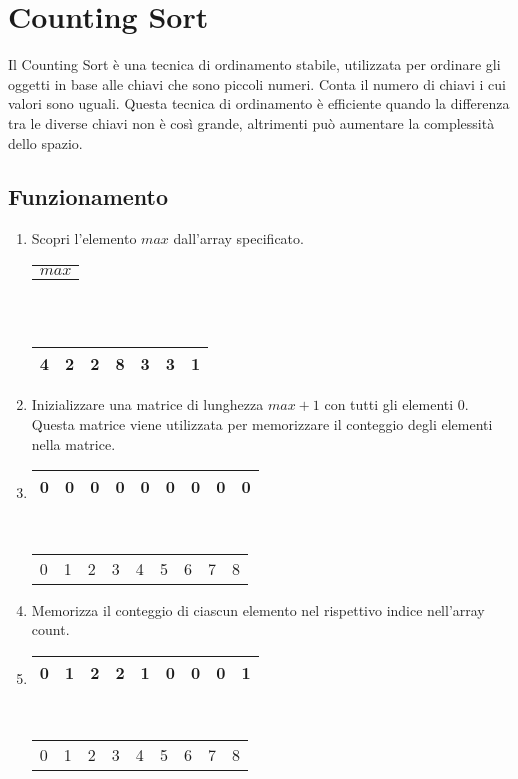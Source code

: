 \section{Counting Sort}
Il Counting Sort è una tecnica di ordinamento stabile, utilizzata per ordinare gli oggetti in base alle chiavi che sono piccoli numeri. Conta il numero di chiavi i cui valori sono uguali. Questa tecnica di ordinamento è efficiente quando la differenza tra le diverse chiavi non è così grande, altrimenti può aumentare la complessità dello spazio.

\subsection{Funzionamento}
\begin{enumerate}
    \item Scopri l'elemento $max$ dall'array specificato. \\
    \begin{tabular}{c}
        $max$ \\ 
    \end{tabular}
    \\
    \begin{tabular}{|c|}
        \hline
        \; 8 \; \\ 
        \hline
    \end{tabular}
    \begin{tabular}{|c|c|c|c|c|c|c|}
        \hline
        4 & 2 & 2 & 8 & 3 & 3 & 1 \\ 
        \hline
    \end{tabular}

    \item Inizializzare una matrice di lunghezza $max+1$ con tutti gli elementi $0$. Questa matrice viene utilizzata per memorizzare il conteggio degli elementi nella matrice.
    \item[]
    \begin{tabular}{|c|c|c|c|c|c|c|c|c|}
        \hline
        0 & 0 & 0 & 0 & 0 & 0 & 0 & 0 & 0 \\ 
        \hline
    \end{tabular}
    \\
    \begin{tabular}{ccccccccc}
        0 & 1 & 2 & 3 & 4 & 5 & 6 & 7 & 8 \\ 
    \end{tabular}

    \item Memorizza il conteggio di ciascun elemento nel rispettivo indice nell'array count.
    \item[]
    \begin{tabular}{|c|c|c|c|c|c|c|c|c|}
        \hline
        0 & 1 & 2 & 2 & 1 & 0 & 0 & 0 & 1 \\ 
        \hline
    \end{tabular}
    \\
    \begin{tabular}{ccccccccc}
        0 & 1 & 2 & 3 & 4 & 5 & 6 & 7 & 8 \\ 
    \end{tabular}


\end{enumerate}
